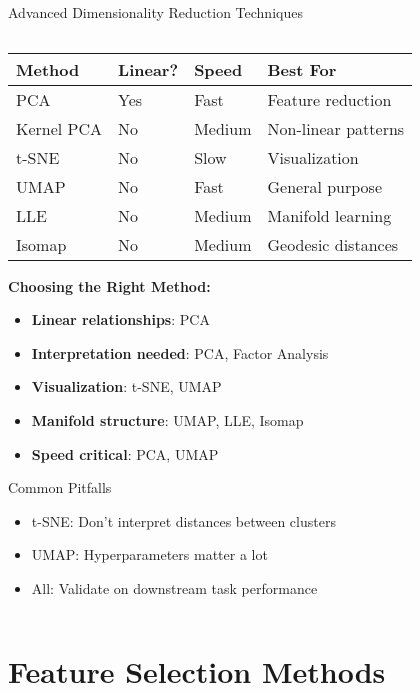 \documentclass[aspectratio=169,11pt]{beamer}
\begin{document}
\begin{frame}[fragile]{Advanced Dimensionality Reduction Techniques}
\begin{columns}
\begin{column}{0.45\textwidth}
\begin{table}
\centering
\tiny
\begin{tabular}{p{1.5cm}p{1cm}p{1cm}p{1.5cm}}
\toprule
\textbf{Method} & \textbf{Linear?} & \textbf{Speed} & \textbf{Best For} \\
\midrule
PCA & Yes & Fast & Feature reduction \\
Kernel PCA & No & Medium & Non-linear patterns \\
t-SNE & No & Slow & Visualization \\
UMAP & No & Fast & General purpose \\
LLE & No & Medium & Manifold learning \\
Isomap & No & Medium & Geodesic distances \\
\bottomrule
\end{tabular}
\end{table}

\vspace{0.3cm}
\textbf{Choosing the Right Method:}
\begin{itemize}
\item \textbf{Linear relationships}: PCA
\item \textbf{Interpretation needed}: PCA, Factor Analysis
\item \textbf{Visualization}: t-SNE, UMAP
\item \textbf{Manifold structure}: UMAP, LLE, Isomap
\item \textbf{Speed critical}: PCA, UMAP
\end{itemize}

\begin{alertblock}{Common Pitfalls}
\begin{itemize}
\item t-SNE: Don't interpret distances between clusters
\item UMAP: Hyperparameters matter a lot
\item All: Validate on downstream task performance
\end{itemize}
\end{alertblock}
\end{column}
\end{columns}
\end{frame}

\section{Feature Selection Methods}
\end{document}
